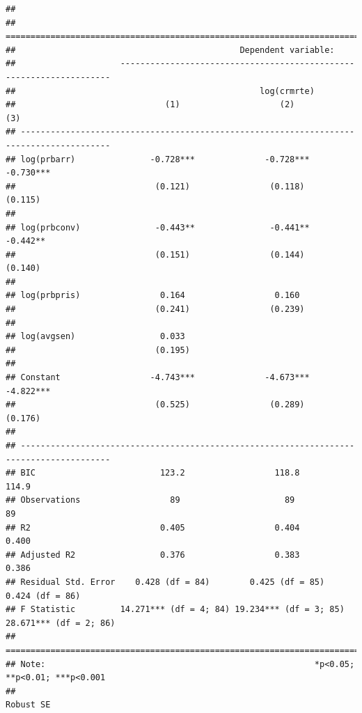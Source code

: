 \documentclass[]{article}
\begin{document}
\begin{verbatim}
## 
## ========================================================================================
##                                             Dependent variable:                         
##                     --------------------------------------------------------------------
##                                                 log(crmrte)                             
##                              (1)                    (2)                    (3)          
## ----------------------------------------------------------------------------------------
## log(prbarr)               -0.728***              -0.728***              -0.730***       
##                            (0.121)                (0.118)                (0.115)        
##                                                                                         
## log(prbconv)               -0.443**               -0.441**               -0.442**       
##                            (0.151)                (0.144)                (0.140)        
##                                                                                         
## log(prbpris)                0.164                  0.160                                
##                            (0.241)                (0.239)                               
##                                                                                         
## log(avgsen)                 0.033                                                       
##                            (0.195)                                                      
##                                                                                         
## Constant                  -4.743***              -4.673***              -4.822***       
##                            (0.525)                (0.289)                (0.176)        
##                                                                                         
## ----------------------------------------------------------------------------------------
## BIC                         123.2                  118.8                  114.9         
## Observations                  89                     89                     89          
## R2                          0.405                  0.404                  0.400         
## Adjusted R2                 0.376                  0.383                  0.386         
## Residual Std. Error    0.428 (df = 84)        0.425 (df = 85)        0.424 (df = 86)    
## F Statistic         14.271*** (df = 4; 84) 19.234*** (df = 3; 85) 28.671*** (df = 2; 86)
## ========================================================================================
## Note:                                                      *p<0.05; **p<0.01; ***p<0.001
##                                                                                Robust SE
\end{verbatim}
\end{document}
